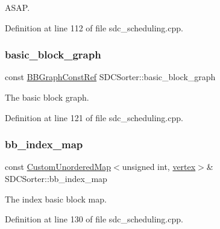 A\+S\+AP. 



Definition at line 112 of file sdc\+\_\+scheduling.\+cpp.

\mbox{\label{classSDCSorter_adf61c72ec9b15ca0417ea2336d1f1547}} 
\subsubsection{\texorpdfstring{basic\+\_\+block\+\_\+graph}{basic\_block\_graph}}
{\footnotesize\ttfamily const \hyperlink{basic__block_8hpp_ab66bdbde3a29e41d079d8a320af9c921}{B\+B\+Graph\+Const\+Ref} S\+D\+C\+Sorter\+::basic\+\_\+block\+\_\+graph\hspace{0.3cm}{\ttfamily [private]}}



The basic block graph. 



Definition at line 121 of file sdc\+\_\+scheduling.\+cpp.

\mbox{\label{classSDCSorter_a6599484ffd363c7ae18fa7bf1c515bc0}} 
\subsubsection{\texorpdfstring{bb\+\_\+index\+\_\+map}{bb\_index\_map}}
{\footnotesize\ttfamily const \hyperlink{custom__map_8hpp_ad1ed68f2ff093683ab1a33522b144adc}{Custom\+Unordered\+Map}$<$unsigned int, \hyperlink{graph_8hpp_abefdcf0544e601805af44eca032cca14}{vertex}$>$\& S\+D\+C\+Sorter\+::bb\+\_\+index\+\_\+map\hspace{0.3cm}{\ttfamily [private]}}



The index basic block map. 



Definition at line 130 of file sdc\+\_\+scheduling.\+cpp.

\mbox{\label{classSDCSorter_ab4626c8c8a617080cbf7173df53094c3}} 
